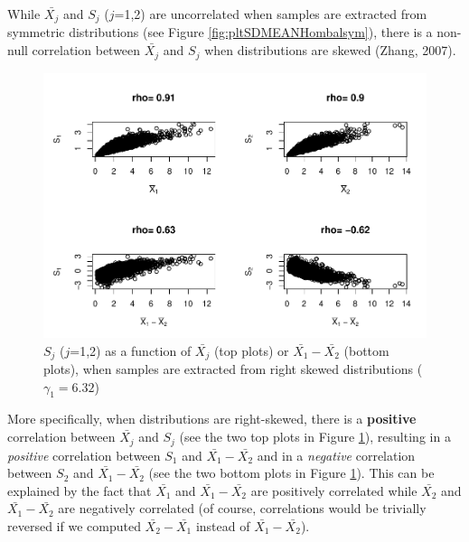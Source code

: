 \documentclass[
  english,
  man,mask,floatsintext]{apa6}
\begin{document}
While \(\bar{X_j}\) and \(S_j\) (\(j\)=1,2) are uncorrelated when samples are extracted from symmetric distributions (see Figure \ref{fig:pltSDMEANHombalsym}), there is a non-null correlation between \(\bar{X_j}\) and \(S_j\) when distributions are skewed (Zhang, 2007).

\begin{figure}
\centering
\includegraphics{Correlation_files/figure-latex/pltSDHombalRskew-1.pdf}
\caption{\label{fig:pltSDHombalRskew}\(S_j\) (\(j\)=1,2) as a function of \(\bar{X_j}\) (top plots) or \(\bar{X_1}-\bar{X_2}\) (bottom plots), when samples are extracted from right skewed distributions (\(\gamma_1 = 6.32\))}
\end{figure}

More specifically, when distributions are right-skewed, there is a \textbf{positive} correlation between \(\bar{X_j}\) and \(S_j\) (see the two top plots in Figure \ref{fig:pltSDHombalRskew}), resulting in a \emph{positive} correlation between \(S_1\) and \(\bar{X_1}-\bar{X_2}\) and in a \emph{negative} correlation between \(S_2\) and \(\bar{X_1}-\bar{X_2}\) (see the two bottom plots in Figure \ref{fig:pltSDHombalRskew}). This can be explained by the fact that \(\bar{X_1}\) and \(\bar{X_1}-\bar{X_2}\) are positively correlated while \(\bar{X_2}\) and \(\bar{X_1}-\bar{X_2}\) are negatively correlated (of course, correlations would be trivially reversed if we computed \(\bar{X_2}-\bar{X_1}\) instead of \(\bar{X_1}-\bar{X_2}\)).
\end{document}
